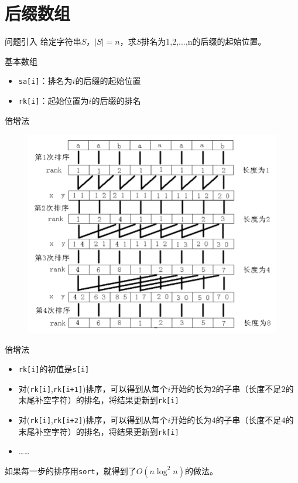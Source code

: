 \documentclass{beamer}
\begin{document}
\section{后缀数组}

\begin{frame}{问题引入}
    \small
    给定字符串$S$，$|S|=n$，求$S$排名为1,2,...,n的后缀的起始位置。
\end{frame}

\begin{frame}[fragile]{基本数组}
    \small
    \begin{itemize}
        \item \verb|sa[i]|：排名为$i$的后缀的起始位置
        \item \verb|rk[i]|：起始位置为$i$的后缀的排名
    \end{itemize}
\end{frame}

\begin{frame}{倍增法}
    \small
    \begin{figure}[H]
        \centering
        \includegraphics[width=.8\textwidth]{pic/sa2.png}
    \end{figure}
\end{frame}

\begin{frame}[fragile]{倍增法}
    \small
    \begin{itemize}
        \item \verb|rk[i]|的初值是\verb|s[i]|
        \pause \item 对(\verb|rk[i]|,\verb|rk[i+1]|)排序，可以得到从每个$i$开始的长为$2$的子串（长度不足$2$的末尾补空字符）的排名，将结果更新到\verb|rk[i]|
        \pause \item 对(\verb|rk[i]|,\verb|rk[i+2]|)排序，可以得到从每个$i$开始的长为$4$的子串（长度不足$4$的末尾补空字符）的排名，将结果更新到\verb|rk[i]|
        \item ……
    \end{itemize}

    \pause
    如果每一步的排序用\verb|sort|，就得到了$O(n\log^2 n)$的做法。
\end{frame}
\end{document}
